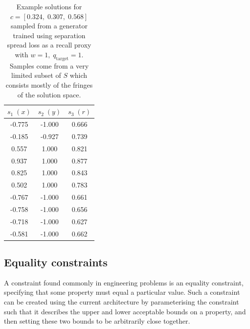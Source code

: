 \documentclass[../../main.tex]{subfiles}
\begin{document}
\begin{table}[H]
    \centering
    \begin{tabular}{*3c}
    \toprule
    $s_1\;(x)$&$s_2\;(y)$&$s_3\;(r)$\\
    \midrule
    -0.775&-1.000&0.666\\-0.185&-0.927&0.739\\0.557&1.000&0.821\\0.937&1.000&0.877\\0.825&1.000&0.843\\0.502&1.000&0.783\\-0.767&-1.000&0.661\\-0.758&-1.000&0.656\\-0.718&-1.000&0.627\\-0.581&-1.000&0.662\\
    \bottomrule
    \end{tabular}
    \caption{Example solutions for $c=[0.324,\;0.307,\;0.568]$ sampled from a generator trained using separation spread loss as a recall proxy with $w=1,\;q_\text{target}=1$.
    Samples come from a very limited subset of $S$ which consists mostly of the fringes of the solution space.}
    \label{table:separationTrainedGeneratorSamples}
\end{table}

\subsection{Equality constraints}

A constraint found commonly in engineering problems is an equality constraint, specifying that some property must equal a particular value.
Such a constraint can be created using the current architecture by parameterising the constraint such that it describes the upper and lower acceptable bounds on a property, and then setting these two bounds to be arbitrarily close together.
\end{document}
